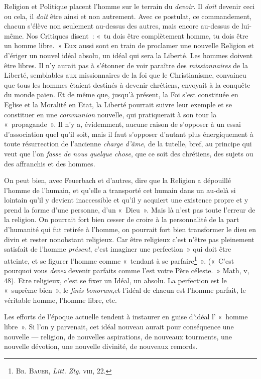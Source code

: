 \documentclass[french,twoside]{book} %
\begin{document}
Religion et Politique placent l’homme sur le terrain du \emph{devoir}. Il \emph{doit} devenir ceci ou cela, il \emph{doit} être ainsi et non autrement. Avec ce postulat, ce commandement, chacun s’élève non seulement au-dessus des autres, mais encore au-dessus de lui-même. Nos Critiques disent : « tu dois être complètement homme, tu dois être un homme libre. » Eux aussi sont en train de proclamer une nouvelle Religion et d’ériger un nouvel idéal absolu, un idéal qui sera la Liberté. Les hommes doivent être libres. Il n’y aurait pas à s’étonner de voir paraître des \emph{missionnaires} de la Liberté, semblables aux missionnaires de la foi que le Christianisme, convaincu que tous les hommes étaient destinés à devenir chrétiens, envoyait à la conquête du monde païen. Et de même que, jusqu’à présent, la Foi s’est constituée en Eglise et la Moralité en Etat, la Liberté pourrait suivre leur exemple et se constituer en une \emph{communion} nouvelle, qui pratiquerait à son tour la « propagande ». Il n’y a, évidemment, aucune raison  de s’opposer à un essai d’association quel qu’il soit, mais il faut s’opposer d’autant plus énergiquement à toute résurrection de l’ancienne \emph{charge d’âme,} de la tutelle, bref, au principe qui veut que l’on \emph{fasse de nous quelque chose}, que ce soit des chrétiens, des sujets ou des affranchis et des hommes.\par
On peut bien, avec Feuerbach et d’autres, dire que la Religion a dépouillé l’homme de l’humain, et qu’elle a transporté cet humain dans un au-delà si lointain qu’il y devient inaccessible et qu’il y acquiert une existence propre et y prend la forme d’une personne, d’un « Dieu ». Mais là n’est pas toute l’erreur de la religion. On pourrait fort bien cesser de croire à la personnalité de la part d’humanité qui fut retirée à l’homme, on pourrait fort bien transformer le dieu en divin et rester nonobstant religieux. Car être religieux c’est n’être pas pleinement satisfait de l’homme \emph{présent}, c’est imaginer une perfection » qui doit être atteinte, et se figurer l’homme comme « tendant à se parfaire\footnote{ \noindent B{\scshape r}. B{\scshape auer}, \emph{Litt. Ztg.} {\scshape viii}, 22.
 } ». (« C’est pourquoi vous \emph{devez} devenir parfaits comme l’est votre Père céleste. » Math, v, 48). Etre religieux, c’est se fixer un Idéal, un absolu. La perfection est le « suprême bien », le \emph{finis bonorum},et l’idéal de chacun est l’homme parfait, le véritable homme, l’homme libre, etc.\par
Les efforts de l’époque actuelle tendent à instaurer en guise d’idéal l’ « homme libre ». Si l’on y parvenait, cet idéal nouveau aurait pour conséquence une nouvelle — religion, de nouvelles aspirations, de nouveaux tourments, une nouvelle dévotion, une nouvelle divinité, de nouveaux remords.\par
\end{document}
